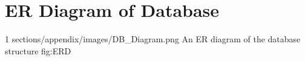 \chapter{ER Diagram of Database}
        {1} %
        {sections/appendix/images/DB_Diagram.png} %
        {An ER diagram of the database structure} %
        {fig:ERD} %